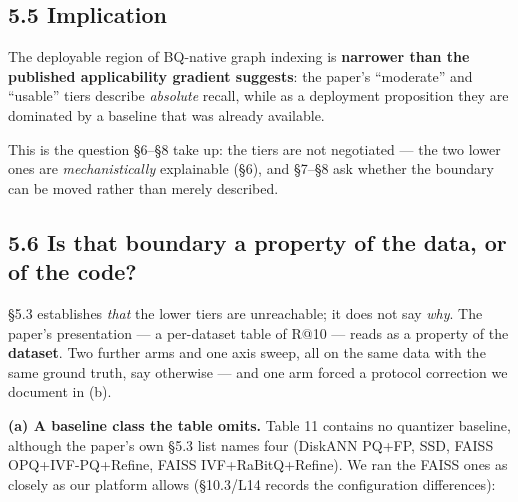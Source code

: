 \documentclass[
  10pt,
]{article}
\begin{document}
\subsection{5.5 Implication}\label{implication}

The deployable region of BQ-native graph indexing is \textbf{narrower
than the published applicability gradient suggests}: the paper's
``moderate'' and ``usable'' tiers describe \emph{absolute} recall, while
as a deployment proposition they are dominated by a baseline that was
already available.

This is the question §6--§8 take up: the tiers are not negotiated ---
the two lower ones are \emph{mechanistically} explainable (§6), and
§7--§8 ask whether the boundary can be moved rather than merely
described.

\subsection{5.6 Is that boundary a property of the data, or of the
code?}\label{is-that-boundary-a-property-of-the-data-or-of-the-code}

§5.3 establishes \emph{that} the lower tiers are unreachable; it does
not say \emph{why}. The paper's presentation --- a per-dataset table of
R@10 --- reads as a property of the \textbf{dataset}. Two further arms
and one axis sweep, all on the same data with the same ground truth, say
otherwise --- and one arm forced a protocol correction we document in
(b).

\textbf{(a) A baseline class the table omits.} Table 11 contains no
quantizer baseline, although the paper's own §5.3 list names four
(DiskANN PQ+FP, SSD, FAISS OPQ+IVF-PQ+Refine, FAISS IVF+RaBitQ+Refine).
We ran the FAISS ones as closely as our platform allows (§10.3/L14
records the configuration differences):
\end{document}
